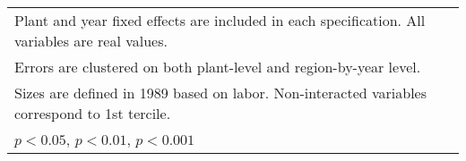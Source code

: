 \begin{table}[htbp]
\begin{tabular}{l*{6}{c}}
\multicolumn{7}{l}{\footnotesize Plant and year fixed effects are included in each specification. All variables are real values.}\\
\multicolumn{7}{l}{\footnotesize Errors are clustered on both plant-level and region-by-year level.}\\
\multicolumn{7}{l}{\footnotesize Sizes are defined in 1989 based on labor. Non-interacted variables correspond to 1st tercile.}\\
\multicolumn{7}{l}{\footnotesize \sym{*} \(p<0.05\), \sym{**} \(p<0.01\), \sym{***} \(p<0.001\)}\\
\end{tabular}
\end{table}
